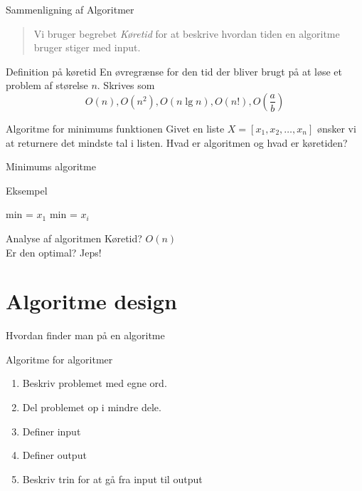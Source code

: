 \documentclass[12pt,t]{beamer}
\begin{document}
\begin{frame}[t]{Sammenligning af Algoritmer}
  \begin{quote}
    Vi bruger begrebet \emph{Køretid} for at beskrive hvordan tiden en
    algoritme bruger stiger med input.
  \end{quote}
  \pause
  \vspace{-1em}
  \begin{block}{Definition på køretid}
    En øvregrænse for den tid der bliver brugt på at løse et problem af
    størelse $n$. Skrives som
    $$
      O(n), O(n^2), O(n \lg n), O(n!), O\left( \frac{a}{b} \right)
    $$
  \end{block}
  \pause
  \begin{exampleblock}{Algoritme for minimums funktionen}
    Givet en liste $X = [x_1,x_2,\dots,x_n]$ ønsker vi at returnere det
    mindste tal i listen. Hvad er algoritmen og hvad er køretiden?
  \end{exampleblock}
\end{frame}

\begin{frame}{Minimums algoritme}
  \begin{block}{Eksempel}
    \vspace{-1.5em}
    \begin{algorithm}[H]
      \caption{\newline Input: En liste $X=[x_1,x_2, \dots, x_n]$
      \newline Ouput: Det mindste tal i listen.
      }
      \begin{algorithmic}
        \State min = $x_1$
        \State min = $x_i$
        \EndIf
        \EndFor
      \end{algorithmic}
    \end{algorithm}
  \end{block}
  \pause
  \begin{block}{Analyse af algoritmen}
    \centering Køretid? \pause $O(n)$ \\
    \pause
    \centering Er den optimal? \pause \alert{Jeps!}
  \end{block}
\end{frame}


\section{Algoritme design}
\begin{frame}[c]{Hvordan finder man på en algoritme}
  \begin{block}{Algoritme for algoritmer}
    \begin{enumerate}
      \item Beskriv problemet med egne ord. \pause
      \item Del problemet op i mindre dele. \pause
      \item Definer input \pause
      \item Definer output \pause
      \item Beskriv trin for at gå fra input til output
    \end{enumerate}
  \end{block}
\end{frame}
\end{document}
